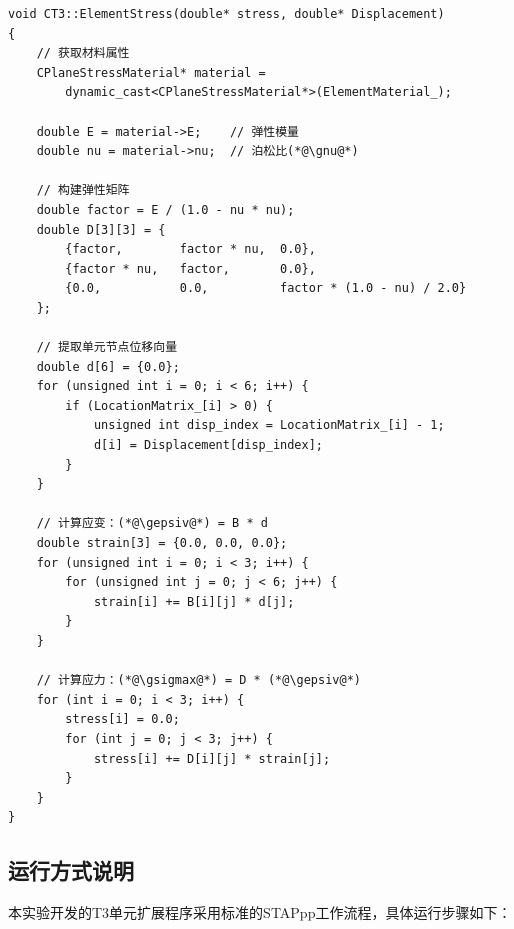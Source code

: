 \documentclass[12pt,a4paper]{article}
\begin{document}
\begin{lstlisting}[caption=单元应力计算实现]
void CT3::ElementStress(double* stress, double* Displacement)
{
    // 获取材料属性
    CPlaneStressMaterial* material = 
        dynamic_cast<CPlaneStressMaterial*>(ElementMaterial_);
    
    double E = material->E;    // 弹性模量
    double nu = material->nu;  // 泊松比(*@\gnu@*)
    
    // 构建弹性矩阵
    double factor = E / (1.0 - nu * nu);
    double D[3][3] = {
        {factor,        factor * nu,  0.0},
        {factor * nu,   factor,       0.0},
        {0.0,           0.0,          factor * (1.0 - nu) / 2.0}
    };
    
    // 提取单元节点位移向量
    double d[6] = {0.0};
    for (unsigned int i = 0; i < 6; i++) {
        if (LocationMatrix_[i] > 0) {
            unsigned int disp_index = LocationMatrix_[i] - 1;
            d[i] = Displacement[disp_index];
        }
    }
    
    // 计算应变：(*@\gepsiv@*) = B * d
    double strain[3] = {0.0, 0.0, 0.0};
    for (unsigned int i = 0; i < 3; i++) {
        for (unsigned int j = 0; j < 6; j++) {
            strain[i] += B[i][j] * d[j];
        }
    }
    
    // 计算应力：(*@\gsigmax@*) = D * (*@\gepsiv@*)
    for (int i = 0; i < 3; i++) {
        stress[i] = 0.0;
        for (int j = 0; j < 3; j++) {
            stress[i] += D[i][j] * strain[j];
        }
    }
}
\end{lstlisting}

\subsection{运行方式说明}

本实验开发的T3单元扩展程序采用标准的STAPpp工作流程，具体运行步骤如下：
\end{document}
